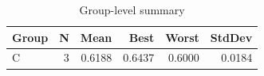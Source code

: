 \begin{table}[htbp]
\centering
\caption{Group-level summary}
\label{tab:group-summary}
\begin{tabular}{lrrrrr}
\toprule
\textbf{Group} & \textbf{N} & \textbf{Mean} & \textbf{Best} & \textbf{Worst} & \textbf{StdDev} \\
\midrule
C & 3 & 0.6188 & 0.6437 & 0.6000 & 0.0184 \\
\bottomrule
\end{tabular}
\end{table}